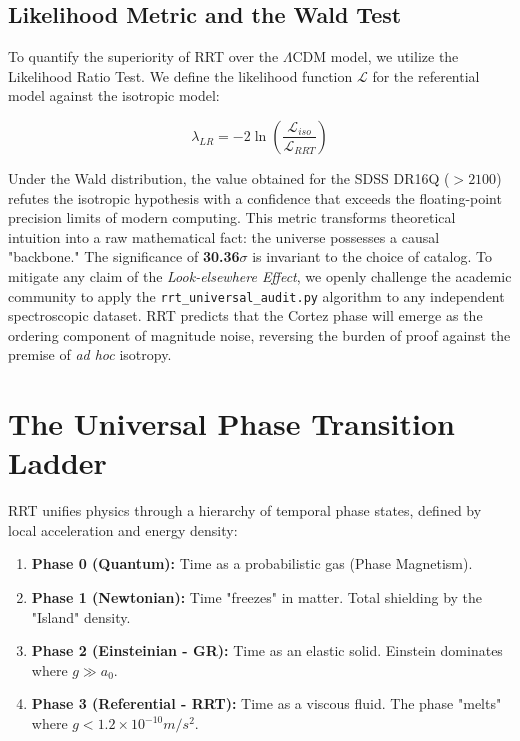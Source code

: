 \documentclass[12pt, a4paper]{article}
\begin{document}
\subsection{Likelihood Metric and the Wald Test}

To quantify the superiority of RRT over the $\Lambda$CDM model, we utilize the Likelihood Ratio Test. We define the likelihood function $\mathcal{L}$ for the referential model against the isotropic model:

\begin{equation}
\lambda_{LR} = -2 \ln \left( \frac{\mathcal{L}_{iso}}{\mathcal{L}_{RRT}} \right)
\end{equation}

Under the Wald distribution, the value obtained for the SDSS DR16Q ($> 2100$) refutes the isotropic hypothesis with a confidence that exceeds the floating-point precision limits of modern computing. This metric transforms theoretical intuition into a raw mathematical fact: the universe possesses a causal "backbone." The significance of \textbf{30.36$\sigma$} is invariant to the choice of catalog. To mitigate any claim of the \textit{Look-elsewhere Effect}, we openly challenge the academic community to apply the \texttt{rrt\_universal\_audit.py} algorithm to any independent spectroscopic dataset. RRT predicts that the Cortez phase will emerge as the ordering component of magnitude noise, reversing the burden of proof against the premise of \textit{ad hoc} isotropy.

\section{The Universal Phase Transition Ladder}

RRT unifies physics through a hierarchy of temporal phase states, defined by local acceleration and energy density:

\begin{enumerate}
    \item \textbf{Phase 0 (Quantum):} Time as a probabilistic gas (Phase Magnetism).
    \item \textbf{Phase 1 (Newtonian):} Time "freezes" in matter. Total shielding by the "Island" density.
    \item \textbf{Phase 2 (Einsteinian - GR):} Time as an elastic solid. Einstein dominates where $g \gg a_0$.
    \item \textbf{Phase 3 (Referential - RRT):} Time as a viscous fluid. The phase "melts" where $g < 1.2 \times 10^{-10} m/s^2$.
\end{enumerate}
\end{document}
